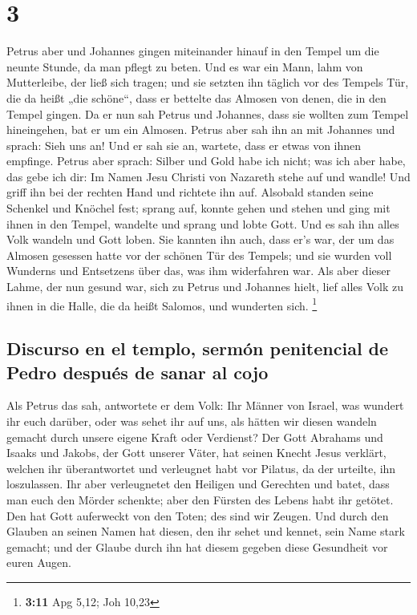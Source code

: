 \hypertarget{section-2}{%
\section{3}\label{section-2}}

 Petrus aber und Johannes gingen miteinander hinauf in den
Tempel um die neunte Stunde, da man pflegt zu beten.  Und
es war ein Mann, lahm von Mutterleibe, der ließ sich tragen; und sie
setzten ihn täglich vor des Tempels Tür, die da heißt „die schöne``,
dass er bettelte das Almosen von denen, die in den Tempel gingen.
 Da er nun sah Petrus und Johannes, dass sie wollten zum
Tempel hineingehen, bat er um ein Almosen.  Petrus aber
sah ihn an mit Johannes und sprach: Sieh uns an!  Und er
sah sie an, wartete, dass er etwas von ihnen empfinge. 
Petrus aber sprach: Silber und Gold habe ich nicht; was ich aber habe,
das gebe ich dir: Im Namen Jesu Christi von Nazareth stehe auf und
wandle!  Und griff ihn bei der rechten Hand und richtete
ihn auf. Alsobald standen seine Schenkel und Knöchel fest;
 sprang auf, konnte gehen und stehen und ging mit ihnen in
den Tempel, wandelte und sprang und lobte Gott.  Und es
sah ihn alles Volk wandeln und Gott loben.  Sie kannten
ihn auch, dass er's war, der um das Almosen gesessen hatte vor der
schönen Tür des Tempels; und sie wurden voll Wunderns und Entsetzens
über das, was ihm widerfahren war.  Als aber dieser
Lahme, der nun gesund war, sich zu Petrus und Johannes hielt, lief alles
Volk zu ihnen in die Halle, die da heißt Salomos, und wunderten sich.
\footnote{\textbf{3:11} Apg 5,12; Joh 10,23}

\hypertarget{discurso-en-el-templo-sermuxf3n-penitencial-de-pedro-despuuxe9s-de-sanar-al-cojo}{%
\subsection{Discurso en el templo, sermón penitencial de Pedro después
de sanar al
cojo}\label{discurso-en-el-templo-sermuxf3n-penitencial-de-pedro-despuuxe9s-de-sanar-al-cojo}}

 Als Petrus das sah, antwortete er dem Volk: Ihr Männer
von Israel, was wundert ihr euch darüber, oder was sehet ihr auf uns,
als hätten wir diesen wandeln gemacht durch unsere eigene Kraft oder
Verdienst?  Der Gott Abrahams und Isaaks und Jakobs, der
Gott unserer Väter, hat seinen Knecht Jesus verklärt, welchen ihr
überantwortet und verleugnet habt vor Pilatus, da der urteilte, ihn
loszulassen.  Ihr aber verleugnetet den Heiligen und
Gerechten und batet, dass man euch den Mörder schenkte; 
aber den Fürsten des Lebens habt ihr getötet. Den hat Gott auferweckt
von den Toten; des sind wir Zeugen.  Und durch den
Glauben an seinen Namen hat diesen, den ihr sehet und kennet, sein Name
stark gemacht; und der Glaube durch ihn hat diesem gegeben diese
Gesundheit vor euren Augen.

